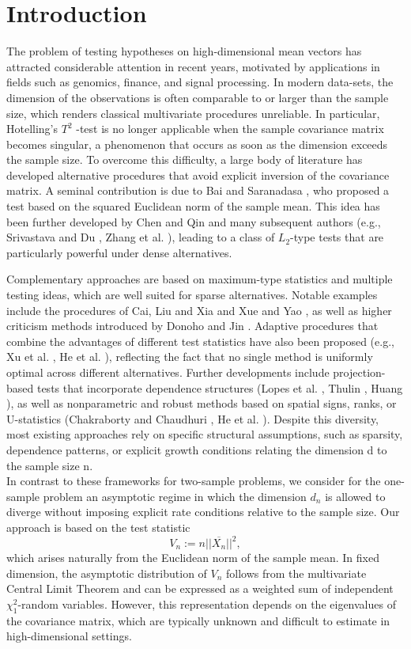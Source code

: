 \documentclass[sn-mathphys,Numbered]{sn-jnl}%
\theoremstyle{thmstyleone}%
\theoremstyle{thmstyletwo}%
\theoremstyle{thmstylethree}%
\begin{document}
\section{Introduction}
The problem of testing hypotheses on high-dimensional mean vectors has attracted considerable attention in recent years, motivated by applications in fields such as genomics, finance, and signal processing. In modern data-sets, the dimension of the observations is often comparable to or larger than the sample size, which renders classical multivariate procedures unreliable. In particular, Hotelling's $T^2$
-test is no longer applicable when the sample covariance matrix becomes singular, a phenomenon that occurs as soon as the dimension exceeds the sample size. To overcome this difficulty, a large body of literature has developed alternative procedures that avoid explicit inversion of the covariance matrix. A seminal contribution is due to Bai and Saranadasa \cite{Bai}, who proposed a test based on the squared Euclidean norm of the sample mean. This idea has been further developed by Chen and Qin \cite{ChenQin} and many subsequent authors (e.g., Srivastava and Du \cite{SrivastavaDu}, Zhang et al. \cite{Zhang}), leading to a class of $L_2$-type tests that are particularly powerful under dense alternatives.

Complementary approaches are based on maximum-type statistics and multiple testing ideas, which are well suited for sparse alternatives. Notable examples include the procedures of Cai, Liu and Xia \cite{Cai} and Xue and Yao \cite{XueYao}, as well as higher criticism methods introduced by Donoho and Jin \cite{DonohoJin}. Adaptive procedures that combine the advantages of different test statistics have also been proposed (e.g., Xu et al. \cite{Xu}, He et al. \cite{He}), reflecting the fact that no single method is uniformly optimal across different alternatives.
Further developments include projection-based tests that incorporate dependence structures (Lopes et al. \cite{Lopes} , Thulin \cite{Thulin}, Huang \cite{Huang}), as well as nonparametric and robust methods based on spatial signs, ranks, or U-statistics (Chakraborty and Chaudhuri \cite{Chakraborty}, He et al. \cite{He}). Despite this diversity, most existing approaches rely on specific structural assumptions, such as sparsity, dependence patterns, or explicit growth conditions relating the dimension d to the sample size n.\\

In contrast to these frameworks for two-sample problems, we consider for the one-sample problem an asymptotic regime in which the dimension $d_n$ is allowed to diverge without imposing explicit rate conditions relative to the sample size. Our approach is based on the test statistic
$$
 V_n := n ||\overline{X_n}||^2,
$$
which arises naturally from the Euclidean norm of the sample mean. In fixed dimension, the asymptotic distribution of $V_n$
follows from the multivariate Central Limit Theorem and can be expressed as a weighted sum of independent $\chi_1^2$-random variables. However, this representation depends on the eigenvalues of the covariance matrix, which are typically unknown and difficult to estimate in high-dimensional settings.\\
\end{document}
